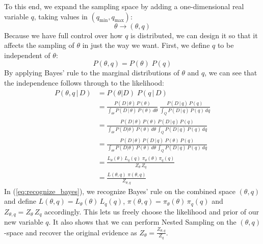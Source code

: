 \documentclass[12pt, a4paper]{report}
\begin{document}
To this end, we expand the sampling space by adding a one-dimensional real variable $q$, taking values in $(q_{\textrm{min}}, q_{\textrm{max}})$:
$$
\theta \rightarrow (\theta, q)
$$
Because we have full control over how $q$ is distributed, we can design it so that it affects the sampling of $\theta$ in just the way we want.
First, we define $q$ to be independent of $\theta$:
$$
P(\theta, q) = P(\theta) \; P(q)
$$
By applying Bayes' rule to the marginal distributions of $\theta$ and $q$, we can see that the independence follows through to the likelihood:
\begin{align}
    P(\theta, q \,|\, D) &= P(\theta | D) \; P(q \,|\, D) \nonumber\\
    &= \frac{P(D \,|\, \theta) \, P(\theta)}{\int_\Theta P(D \,|\, \theta) \, P(\theta) \, d\theta} \, \frac{P(D \,|\, q) \, P(q)}{\int_Q P(D \,|\, q) \, P(q) \, dq} \nonumber\\
    &= \frac{P(D \,|\, \theta) \, P(\theta) \, P(D \,|\, q) \, P(q)}{\int_\Theta P(D | \theta) \, P(\theta) \, d\theta \, \int_Q P(D \,|\, q) \, P(q) \, dq} \nonumber\\
    &= \frac{P(D \,|\, \theta) \, P(D \,|\, q) \; P(\theta) \, P(q)}{\int_\Theta P(D | \theta) \, P(\theta) \, d\theta \, \int_Q P(D \,|\, q) \, P(q) \, dq} \nonumber\\
    &= \frac{L_\theta(\theta) \, L_q(q) \; \pi_\theta(\theta) \, \pi_q(q)}{Z_\theta \, Z_q} \label{eq:recognize_bayes}\\
    &= \frac{L(\theta, q) \; \pi(\theta, q)}{Z_{\theta, q}} \nonumber
\end{align}
In (\ref{eq:recognize_bayes}), we recognize Bayes' rule on the combined space $(\theta, q)$ and define $L(\theta, q) = L_\theta(\theta) \, L_q(q)$, $\pi(\theta, q) = \pi_\theta(\theta) \, \pi_q(q)$ and $Z_{\theta, q} = Z_\theta \, Z_q$ accordingly.
This lets us freely choose the likelihood and prior of our new variable $q$.
It also shows that we can perform Nested Sampling on the $(\theta, q)$-space and recover the original evidence as $Z_\theta = \frac{Z_{\theta, q}}{Z_q}$.
\end{document}
